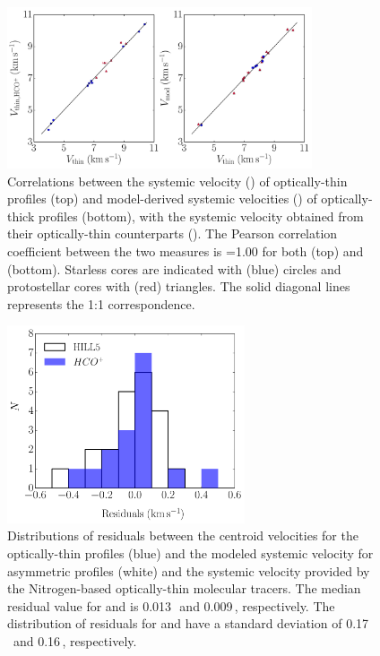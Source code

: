 \documentclass[iop,twocolappendix]{emulateapj}
\begin{document}
\begin{figure}
\begin{center}
\includegraphics[width=9cm]{ModelvsThinSystemic.pdf}
\caption{Correlations between the systemic velocity (\Vcent) of optically-thin {\HCO} profiles (top) and model-derived systemic velocities (\Vmod) of optically-thick {\HCO} profiles (bottom), with the systemic velocity obtained from their optically-thin counterparts (\Vthin). The Pearson correlation coefficient between the two measures is {\rhoPCC}=1.00 for both {\Vcent} (top) and {\Vmod} (bottom). Starless cores are indicated with (blue) circles and protostellar cores with (red) triangles. The solid diagonal lines represents the 1:1 correspondence.}
\label{fig:movelvsthinsystemic}
\end{center}
\end{figure}

\begin{figure}
\begin{center}
\includegraphics[width=7cm]{ResidualsHist.pdf}
\caption{Distributions of residuals between the centroid velocities for the optically-thin {\HCO} profiles (blue) and the modeled systemic velocity for asymmetric {\HCO} profiles (white) and the systemic velocity provided by the Nitrogen-based optically-thin molecular tracers. The median residual value for {\Vcent} and {\Vmod} is 0.013\,\kms\ and 0.009\,\kms, respectively. The distribution of residuals for {\Vcent} and {\Vmod} have a standard deviation of 0.17\,\kms\ and 0.16\,\kms, respectively.}
\label{fig:residualhist}
\end{center}
\end{figure}
\end{document}
